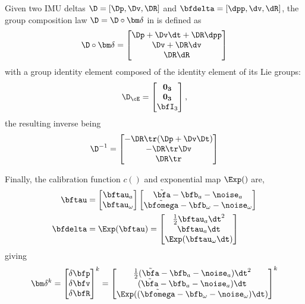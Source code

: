 Given two IMU deltas $\D=[\Dp,\Dv,\DR]$ and $\bfdelta=[\dpp,\dv,\dR]$, the group composition law $\D=\D\circ\bm\delta$ in  is defined as
%
\begin{equation} 
    \label{equ:composition_delta}
    \D \circ \bm\delta
    =
    \begin{bmatrix}
        \Dp + \Dv\dt + \DR\dpp \\
        \Dv + \DR\dv \\
        \DR\dR 
    \end{bmatrix}
\end{equation}
%
with a group identity element composed of the identity element of its Lie groups:
%
\begin{equation}
    \D_{\cE} = \begin{bmatrix}
    \bf0_3\\ \bf0_3\\ \bfI_3
    \end{bmatrix},
\end{equation}
%
the resulting inverse being
%
\begin{equation}
\label{equ:inverse_delta}
    \D^{-1} =     \begin{bmatrix}
    - \DR\tr(\Dp + \Dv \Dt) \\
    - \DR\tr \Dv \\
      \DR\tr
    \end{bmatrix}
\end{equation}
%

Finally, the calibration function $c()$ and exponential map $\Exp()$ are,
%
\begin{align}
    \bftau &= \begin{bmatrix}
    \bftau_a \\ \bftau_\omega
    \end{bmatrix}\begin{bmatrix}
    \tilde\bfa-\bfb_a-\noise_a \\
    \tilde{\bfomega}-\bfb_\omega-\noise_\omega
    \end{bmatrix}\\
    \bfdelta &= \Exp(\bftau) = \begin{bmatrix}
    \frac12\bftau_a\dt^2 \\
    \bftau_a\dt \\
    \Exp(\bftau_\omega\dt)
    \end{bmatrix}
\end{align}
%
giving
%
\begin{align}
    \bm\delta^k = \begin{bmatrix}
    \delta\bfp\\\delta\bfv\\\delta\bfR
    \end{bmatrix}^k =
    \begin{bmatrix}
    \tfrac12(\tilde\bfa-\bfb_a-\noise_a)\dt^2 \\
    (\tilde\bfa-\bfb_a-\noise_a)\dt \\
    \Exp((\tilde{\bfomega}-\bfb_\omega-\noise_\omega)\dt)
    \end{bmatrix}^k
    \label{eq:delta_function}
\end{align}





